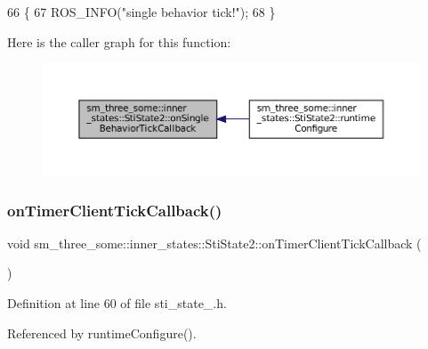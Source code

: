 \begin{DoxyCode}
66   \{
67     ROS\_INFO(\textcolor{stringliteral}{"single behavior tick!"});
68   \}
\end{DoxyCode}
Here is the caller graph for this function\+:
\nopagebreak
\begin{figure}[H]
\begin{center}
\leavevmode
\includegraphics[width=350pt]{structsm__three__some_1_1inner__states_1_1StiState2_ad29b2ce248085bc08950b43726a84d18_icgraph}
\end{center}
\end{figure}
\mbox{\label{structsm__three__some_1_1inner__states_1_1StiState2_a59008027e276123e39a8908116ea8ab9}} 
\subsubsection{\texorpdfstring{on\+Timer\+Client\+Tick\+Callback()}{onTimerClientTickCallback()}}
{\footnotesize\ttfamily void sm\+\_\+three\+\_\+some\+::inner\+\_\+states\+::\+Sti\+State2\+::on\+Timer\+Client\+Tick\+Callback (\begin{DoxyParamCaption}{ }\end{DoxyParamCaption})\hspace{0.3cm}{\ttfamily [inline]}}



Definition at line 60 of file sti\+\_\+state\+\_.\+h.



Referenced by runtime\+Configure().


